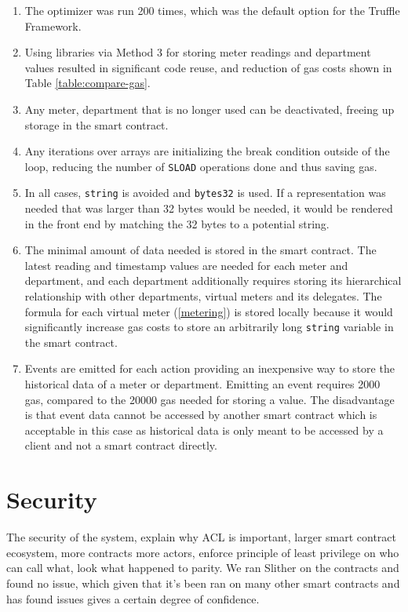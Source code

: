 \begin{enumerate}
    \item The optimizer was run 200 times, which was the default option for the Truffle Framework.
    \item Using libraries via Method 3 for storing meter readings and department values resulted in significant code reuse, and reduction of gas costs shown in Table \ref{table:compare-gas}. 
    \item Any meter, department that is no longer used can be deactivated, freeing up storage in the smart contract.
    \item Any iterations over arrays are initializing the break condition outside of the loop, reducing the number of \texttt{SLOAD} operations done and thus saving gas.
    \item In all cases, \texttt{string} is avoided and \texttt{bytes32} is used. If a representation was needed that was larger than 32 bytes would be needed, it would be rendered in the front end by matching the 32 bytes to a potential string. 
    \item The minimal amount of data needed is stored in the smart contract. The latest reading and timestamp values are needed for each meter and department, and each department additionally requires storing its hierarchical relationship with other departments, virtual meters and its delegates. The formula for each virtual meter (\ref{metering}) is stored locally because it would significantly increase gas costs to store an arbitrarily long \texttt{string} variable in the smart contract.
    \item Events are emitted for each action providing an inexpensive way to store the historical data of a meter or department. Emitting an event requires 2000 gas, compared to the 20000 gas needed for storing a value. The disadvantage is that event data cannot be accessed by another smart contract which is acceptable in this case as historical data is only meant to be accessed by a client and not a smart contract directly. 
\end{enumerate}



\section{Security}
The security of the system, explain why ACL is important, larger smart contract ecosystem, more contracts more actors, enforce principle of least privilege on who can call what, look what happened to parity. We ran Slither on the contracts and found no issue, which given that it's been ran on many other smart contracts and has found issues gives a certain degree of confidence. 

